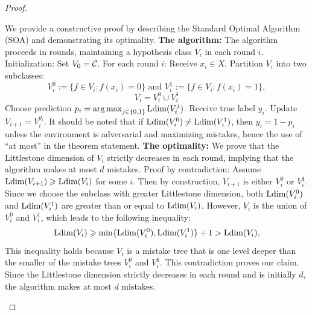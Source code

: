 \begin{proof}
\begin{outline}
\0 We provide a constructive proof by describing the Standard Optimal Algorithm (SOA) and demonstrating its optimality.
    \1 \textbf{The algorithm:} The algorithm proceeds in rounds, maintaining a hypothesis class $V_i$ in each round $i$.
        \2 Initialization: Set $V_0= \mathcal{C}$.
        \2 For each round $i$:
            \3 Receive $x_i\in X$.
            \3 Partition $V_i$ into two subclasses:
            $$V_i^0:=\{f\in V_i : f(x_i)=0\} \text{ and } V_i^1:=\{f\in V_i : f(x_i)=1\},$$
            $$V_i = V_i^0 \cup V_i^1$$
            \3 Choose prediction $p_i = \operatorname*{arg\,max}_{j\in\{0,1\}} \operatorname{Ldim}(V_i^j)$.
            \3 Receive true label $y_i$. 
            \3 Update $V_{i+1} = V_i^{y_i}$. 
    \1[] It should be noted that if $\operatorname{Ldim}(V_i^0) \neq \operatorname{Ldim}(V_i^1)$, then $y_i = 1-p_i$ unless the environment is adversarial and maximizing mistakes, hence the use of \enquote{at most} in the theorem statement.
    \1 \textbf{The optimality:} We prove that the Littlestone dimension of $V_i$ strictly decreases in each round, implying that the algorithm makes at most $d$ mistakes. Proof by contradiction:
        \2 Assume $\operatorname{Ldim}(V_{i+1}) \geqslant \operatorname{Ldim}(V_i)$ for some $i$. Then by construction, $V_{i+1}$ is either $V_i^0$ or $V_i^1$.
        \2 Since we choose the subclass with greater Littlestone dimension, both $\operatorname{Ldim}(V_i^0)$ and $\operatorname{Ldim}(V_i^1)$ are greater than or equal to $\operatorname{Ldim}(V_i)$. However, $V_i$ is the union of $V_i^0$ and $V_i^1$, which leads to the following inequality:
        $$\operatorname{Ldim}(V_i) \geqslant \min \{\operatorname{Ldim}(V_i^0), \operatorname{Ldim}(V_i^1)\} + 1 > \operatorname{Ldim}(V_i),$$
        This inequality holds because $V_i$ is a mistake tree that is one level deeper than the smaller of the mistake trees $V_i^0$ and $V_i^1$. This contradiction proves our claim.
    \1[] Since the Littlestone dimension strictly decreases in each round and is initially $d$, the algorithm makes at most $d$ mistakes.
\end{outline}
\end{proof}

